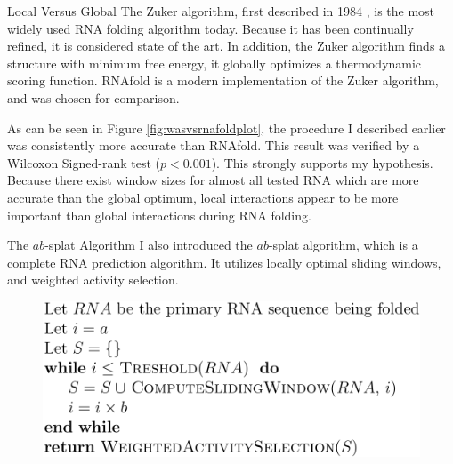 \documentclass[final]{beamer}
\newlength{\onecolwid}
\begin{document}
\begin{frame}[t]
\begin{columns}[t]
\begin{column}{\onecolwid}
\begin{block}{Local Versus Global}
The Zuker algorithm, first described in 1984 \cite{someone}, is the most widely used RNA folding algorithm today. Because it has been continually refined, it is considered state of the art. In addition, the Zuker algorithm finds a structure with minimum free energy, it globally optimizes a thermodynamic scoring function. RNAfold \cite{someone} is a modern implementation of the Zuker algorithm, and was chosen for comparison.


As can be seen in Figure \ref{fig:wasvsrnafoldplot}, the procedure I described earlier was consistently more accurate than RNAfold. This result was verified by a Wilcoxon Signed-rank test ($p < 0.001$). This strongly supports my hypothesis. Because there exist window sizes for almost all tested RNA which are more accurate than the global optimum, local interactions appear to be more important than global interactions during RNA folding.
            
         
          \end{block}
    
     \begin{block}{The $ab$-splat Algorithm}
I also introduced the $ab$-splat algorithm, which is a complete RNA prediction algorithm. It utilizes locally optimal sliding windows, and weighted activity selection.
\vspace{0.25in}
        \begin{figure}
          \begin{center}
            \includegraphics[width=10in]{pseudo.png} \\
            \label{fig:psuedocode}
          \end{center}
        \end{figure}        


          \end{block} 
          
          
          

\end{column}
\end{columns}
\end{frame}
\end{document}
